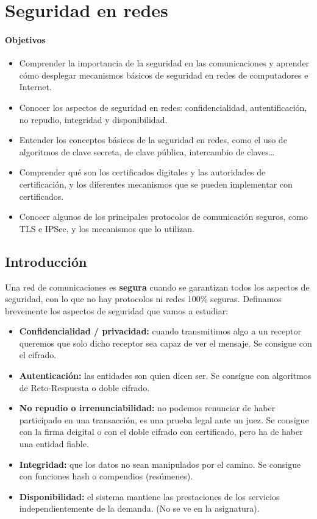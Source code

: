 \chapter{Seguridad en redes}
\subsubsection{Objetivos}
\begin{itemize}
    \item Comprender la importancia de la seguridad en las comunicaciones y aprender cómo desplegar mecanismos básicos de seguridad en redes de computadores e Internet.
    \item Conocer los aspectos de seguridad en redes: confidencialidad, autentificación, no repudio, integridad y disponibilidad. 
    \item Entender los conceptos básicos de la seguridad en redes, como el uso de algoritmos de clave secreta, de clave pública, intercambio de claves\ldots
    \item Comprender qué son los certificados digitales y las autoridades de certificación, y los diferentes mecanismos que se pueden implementar con certificados. 
    \item Conocer algunos de los principales protocolos de comunicación seguros, como TLS e IPSec, y los mecanismos que lo utilizan. 
\end{itemize}


\section{Introducción}
Una red de comunicaciones es \textbf{segura} cuando se garantizan todos los aspectos de seguridad, con lo que no hay protocolos ni redes 100\% seguras. Definamos brevemente los aspectos de seguridad que vamos a estudiar:
\begin{itemize}
    \item \textbf{Confidencialidad / privacidad:} cuando transmitimos algo a un receptor queremos que solo dicho receptor sea capaz de ver el mensaje. Se consigue con el cifrado. 
    \item \textbf{Autenticación:} las entidades son quien dicen ser. Se consigue con algoritmos de Reto-Respuesta o doble cifrado. 
    \item \textbf{No repudio o irrenunciabilidad:} no podemos renunciar de haber participado en una transacción, es una prueba legal ante un juez. Se consigue con la firma deigital o con el doble cifrado con certificado, pero ha de haber una entidad fiable. 
    \item \textbf{Integridad:} que los datos no sean manipulados por el camino. Se consigue con funciones hash o compendios (resúmenes).
    \item \textbf{Disponibilidad:} el sistema mantiene las prestaciones de los servicios independientemente de la demanda. (No se ve en la asignatura).
\end{itemize}

